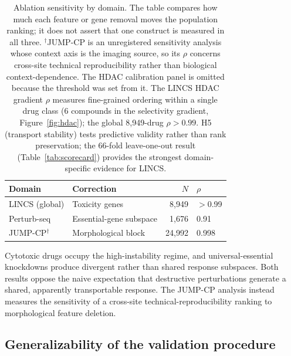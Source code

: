 \documentclass[11pt]{article}
\begin{document}
\begin{table}[t]
\centering
\caption{Ablation sensitivity by domain. The table compares how much each
feature or gene removal moves the population ranking; it does not assert that
one construct is measured in all three. $^{\dagger}$JUMP-CP is an unregistered
sensitivity analysis whose context axis is the imaging source, so its $\rho$
concerns cross-site technical reproducibility rather than biological
context-dependence. The HDAC calibration panel is omitted
because the threshold was set from it. The LINCS HDAC gradient $\rho$
measures fine-grained ordering within a single drug class (6 compounds
in the selectivity gradient, Figure~\ref{fig:hdac});
the global 8{,}949-drug $\rho > 0.99$. H5 (transport stability) tests
predictive validity rather than rank preservation; the 66-fold
leave-one-out result (Table~\ref{tab:scorecard}) provides the strongest
domain-specific evidence for LINCS.}
\label{tab:cross_domain}
\small
\begin{tabular}{llrl}
\toprule
Domain & Correction & $N$ & $\rho$ \\
\midrule
LINCS (global) & Toxicity genes & 8{,}949 & $>$0.99 \\
Perturb-seq & Essential-gene subspace & 1{,}676 & 0.91 \\
JUMP-CP$^{\dagger}$ & Morphological block & 24{,}992 & 0.998 \\
\bottomrule
\end{tabular}
\end{table}

Cytotoxic drugs occupy the high-instability regime, and universal-essential
knockdowns produce divergent rather than shared response subspaces. Both
results oppose the naive expectation that destructive perturbations generate a
shared, apparently transportable response. The JUMP-CP analysis instead
measures the sensitivity of a cross-site technical-reproducibility ranking to
morphological feature deletion.

\subsection{Generalizability of the validation procedure}
\end{document}
